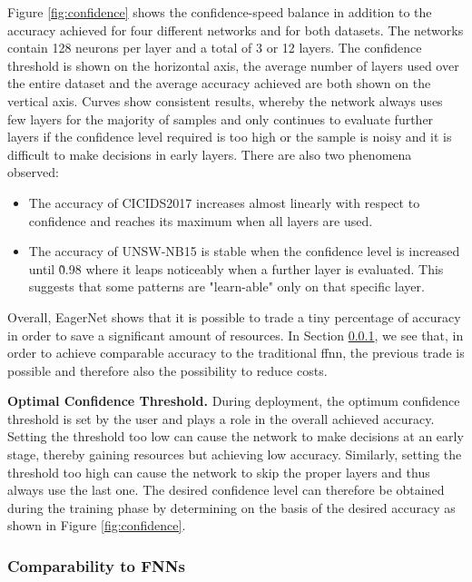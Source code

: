 \documentclass[conference]{IEEEtran}
\begin{document}
Figure \ref{fig:confidence} shows the confidence-speed balance in addition to the accuracy achieved for four different networks and for both datasets. The networks contain 128 neurons per layer and a total of 3 or 12 layers. The confidence threshold is shown on the horizontal axis, the average number of layers used over the entire dataset and the average accuracy achieved are both shown on the vertical axis. Curves show consistent results, whereby the network always uses few layers for the majority of samples and only continues to evaluate further layers if the confidence level required is too high or the sample is noisy and it is difficult to make decisions in early layers. There are also two phenomena observed:
\begin{itemize}
\item The accuracy of CICIDS2017 increases almost linearly with respect to confidence and reaches its maximum when all layers are used.
\item The accuracy of UNSW-NB15 is stable when the confidence level is increased until \~0.98 where it leaps noticeably when a further layer is evaluated. This suggests that some patterns are "learn-able" only on that specific layer.
\end{itemize}
Overall, EagerNet shows that it is possible to trade a tiny percentage of accuracy in order to save a significant amount of resources. In Section \ref{comparability_to_fnns}, we see that, in order to achieve comparable accuracy to the traditional \gls{ffnn}, the previous trade is possible and therefore also the possibility to reduce costs.


\textbf{Optimal Confidence Threshold.}
During deployment, the optimum confidence threshold is set by the user and plays a role in the overall achieved accuracy. Setting the threshold too low can cause the network to make decisions at an early stage, thereby gaining resources but achieving low accuracy. Similarly, setting the threshold too high can cause the network to skip the proper layers and thus always use the last one. The desired confidence level can therefore be obtained during the training phase by determining on the basis of the desired accuracy as shown in Figure \ref{fig:confidence}.

\subsubsection{Comparability to FNNs}
\label{comparability_to_fnns}
\end{document}
